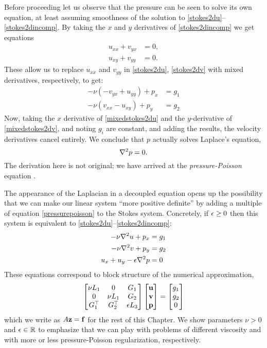 Before proceeding let us observe that the pressure can be seen to solve its own equation, at least assuming smoothness of the solution to \eqref{stokes2du}--\eqref{stokes2dincomp}.  By taking the $x$ and $y$ derivatives of \eqref{stokes2dincomp} we get equations
\begin{align*}
u_{xx} + v_{yx} &= 0, \\
u_{xy} + v_{yy} &= 0.
\end{align*}
These allow us to replace $u_{xx}$ and $v_{yy}$ in \eqref{stokes2du}, \eqref{stokes2dv} with mixed derivatives, respectively, to get:
\begin{align}
-\nu \left(-v_{yx} + u_{yy}\right) + p_x &= g_1 \label{mixedstokes2du} \\
-\nu \left(v_{xx} - u_{xy}\right) + p_y &= g_2 \label{mixedstokes2dv}
\end{align}
Now, taking the $x$ derivative of \eqref{mixedstokes2du} and the $y$-derivative of \eqref{mixedstokes2dv}, and noting $g_i$ are constant, and adding the results, the velocity derivatives cancel entirely.  We conclude that $p$ actually solves Laplace's equation,
\begin{equation}
\nabla^2 p = 0. \label{pressurepoisson}
\end{equation}
The derivation here is not original; we have arrived at the \emph{pressure-Poisson} equation \citep{Ockendonetal2003}.

The appearance of the Laplacian in a decoupled equation opens up the possibility that we can make our linear system ``more positive definite'' by adding a multiple of equation \eqref{pressurepoisson} to the Stokes system.  Concretely, if $\epsilon\ge 0$ then this system is equivalent to \eqref{stokes2du}--\eqref{stokes2dincomp}:
\begin{align}
-\nu \nabla^2 u + p_x &= g_1 \label{ppstokes2du} \\
-\nu \nabla^2 v + p_y &= g_2 \label{ppstokes2dv} \\
u_x + u_y - \epsilon \nabla^2 p &= 0 \label{ppstokes2dincomp}
\end{align}
These equations correspond to block structure of the numerical approximation,
\begin{equation}
\begin{bmatrix}
    \nu L_1 & 0 & G_1 \\
    0 & \nu L_1 & G_2 \\
    G_1^\top & G_2^\top & \epsilon L_3
    \end{bmatrix}
    \begin{bmatrix}
    \mathbf{u} \\ \mathbf{v} \\ \mathbf{p}
    \end{bmatrix}
    =
    \begin{bmatrix}
    g_1 \\ g_2 \\ 0
    \end{bmatrix} \label{blockppstokes}
\end{equation}
which we write as $A\mathbf{z} = \mathbf{f}$ for the rest of this Chapter.  We show parameters $\nu>0$ and $\epsilon \in \mathbb{R}$ to emphasize that we can play with problems of different viscosity and with more or less pressure-Poisson regularization, respectively. 


